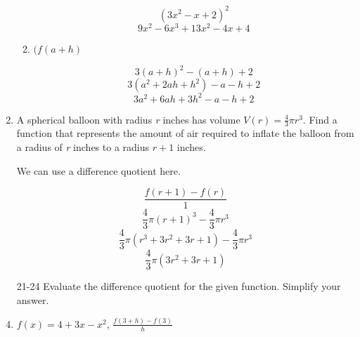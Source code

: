 \documentclass{article}
\begin{document}
\begin{enumerate}
\begin{enumerate}
					$$ (3x^2 - x + 2)^2$$
					$$9x^2 - 6x^3 + 13x^2 - 4x + 4$$
					
				\item $(f(a + h)$
					
					$$3(a + h)^2 - (a + h) + 2 $$
					$$3(a^2 + 2ah + h^2) - a - h + 2 $$
					$$3a^2 + 6ah + 3h^2 - a - h + 2 $$
			\end{enumerate}
			
			\item A spherical balloon with radius \emph{r} inches has volume $V(r) = \frac{4}{3}\pi  r^3$.
				Find a function that represents the amount of air required to inflate the balloon from a
				radius of \emph{r} inches to a radius $r + 1$ inches.
				
				We can use a difference quotient here.
				
				$$\frac{f(r + 1) - f(r)}{1}$$
				$$\frac{4}{3}\pi (r + 1)^3 - \frac{4}{3}\pi r^3$$
				$$\frac{4}{3}\pi (r^3 + 3r^2 + 3r + 1) - \frac{4}{3} \pi r^3$$
				$$\frac{4}{3} \pi (3r^2 + 3r + 1) $$
				
			\item[21-24] Evaluate the difference quotient for the given function. Simplify your answer.
			
		
			\item $f(x) = 4 + 3x - x^2$, $\frac{f(3 + h) - f(3)}{h}$

	\end{enumerate}
\end{document}
